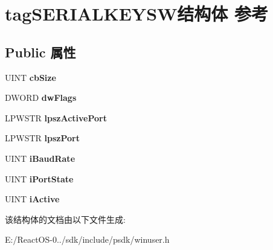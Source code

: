 \hypertarget{structtag_s_e_r_i_a_l_k_e_y_s_w}{}\section{tag\+S\+E\+R\+I\+A\+L\+K\+E\+Y\+S\+W结构体 参考}
\label{structtag_s_e_r_i_a_l_k_e_y_s_w}
\subsection*{Public 属性}
\begin{DoxyCompactItemize}
\item 
\mbox{\label{structtag_s_e_r_i_a_l_k_e_y_s_w_a9dfb0cb76f39b04849f0e3555c1e1a8b}} 
U\+I\+NT {\bfseries cb\+Size}
\item 
\mbox{\label{structtag_s_e_r_i_a_l_k_e_y_s_w_a6dec7949ec65cfc61ad37645661321e9}} 
D\+W\+O\+RD {\bfseries dw\+Flags}
\item 
\mbox{\label{structtag_s_e_r_i_a_l_k_e_y_s_w_ab31a8bbf78f7b6b520582dc5805de43f}} 
L\+P\+W\+S\+TR {\bfseries lpsz\+Active\+Port}
\item 
\mbox{\label{structtag_s_e_r_i_a_l_k_e_y_s_w_accbd81fbe41d58233b378d09f2cfed53}} 
L\+P\+W\+S\+TR {\bfseries lpsz\+Port}
\item 
\mbox{\label{structtag_s_e_r_i_a_l_k_e_y_s_w_adfa095f53b4956b1a856cd80c12397d2}} 
U\+I\+NT {\bfseries i\+Baud\+Rate}
\item 
\mbox{\label{structtag_s_e_r_i_a_l_k_e_y_s_w_ac416642e779c4b0fe3bcbbfce38719fa}} 
U\+I\+NT {\bfseries i\+Port\+State}
\item 
\mbox{\label{structtag_s_e_r_i_a_l_k_e_y_s_w_a518779f085144eeee46e657f88a9bf4c}} 
U\+I\+NT {\bfseries i\+Active}
\end{DoxyCompactItemize}


该结构体的文档由以下文件生成\+:\begin{DoxyCompactItemize}
\item 
E\+:/\+React\+O\+S-\/0../sdk/include/psdk/winuser.\+h\end{DoxyCompactItemize}

